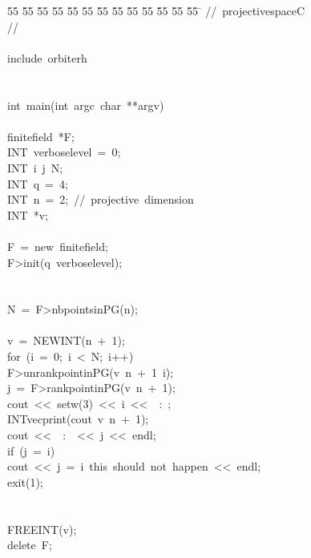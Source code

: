 %
%
\begin{tabbing}
55 \= 55 \= 55 \= 55 \= 55 \= 55 \= 55 \= 55 \= 55 \= 55 \= 55 \= 55 \= 55 \= \kill
//\ projectivespaceC\\[0pt]
//\ \\[0pt]
\\[0pt]
include\ orbiterh\\[0pt]
\\[0pt]
\\[0pt]
int\ main(int\ argc\ char\ **argv)\\[0pt]
\\[0pt]
\>finitefield\ *F;\\[0pt]
\>INT\ verboselevel\ =\ 0;\\[0pt]
\>INT\ i\ j\ N;\\[0pt]
\>INT\ q\ =\ 4;\\[0pt]
\>INT\ n\ =\ 2;\ //\ projective\ dimension\\[0pt]
\>INT\ *v;\\[0pt]
\\[0pt]
\>F\ =\ new\ finitefield;\\[0pt]
\>F>init(q\ verboselevel);\\[0pt]
\\[0pt]
\>\\[0pt]
\>N\ =\ F>nbpointsinPG(n);\\[0pt]
\\[0pt]
\>v\ =\ NEWINT(n\ +\ 1);\\[0pt]
\>for\ (i\ =\ 0;\ i\ <\ N;\ i++)\ \\[0pt]
\>\>F>unrankpointinPG(v\ n\ +\ 1\ i);\\[0pt]
\>\>j\ =\ F>rankpointinPG(v\ n\ +\ 1);\\[0pt]
\>\>cout\ <<\ setw(3)\ <<\ i\ <<\ \ :\ ;\\[0pt]
\>\>INTvecprint(cout\ v\ n\ +\ 1);\\[0pt]
\>\>cout\ <<\ \ :\ \ <<\ j\ <<\ endl;\\[0pt]
\>\>if\ (j\ =\ i)\ \\[0pt]
\>\>\>cout\ <<\ j\ =\ i\ this\ should\ not\ happen\ <<\ endl;\\[0pt]
\>\>\>exit(1);\\[0pt]
\>\>\>\\[0pt]
\>\>\\[0pt]
\>FREEINT(v);\\[0pt]
\>delete\ F;\\[0pt]
\\[0pt]
\\[0pt]
\\[0pt]
\end{tabbing}
